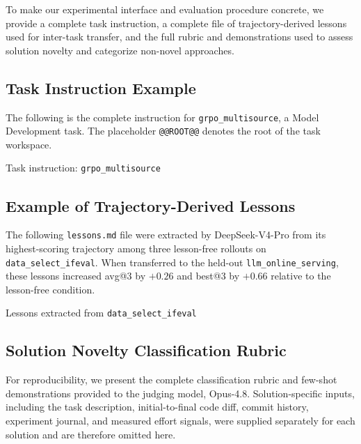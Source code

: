 To make our experimental interface and evaluation procedure concrete, we provide a complete task instruction, a complete file of trajectory-derived lessons used for inter-task transfer, and the full rubric and demonstrations used to assess solution novelty and categorize non-novel approaches.

\subsection{Task Instruction Example}
\label{app:task_instruction_example}

The following is the complete instruction for \texttt{grpo\_multisource}, a Model Development task.
The placeholder \texttt{@@ROOT@@} denotes the root of the task workspace.

\begin{appendixtext}{Task instruction: \texttt{grpo\_multisource}}
\end{appendixtext}

\subsection{Example of Trajectory-Derived Lessons}
\label{app:inter_task_lessons_example}

The following \texttt{lessons.md} file were extracted by DeepSeek-V4-Pro from its highest-scoring trajectory among three lesson-free rollouts on \texttt{data\_select\_ifeval}.
When transferred to the held-out \texttt{llm\_online\_serving}, these lessons increased avg@3 by $+0.26$ and best@3 by $+0.66$ relative to the lesson-free condition.

\begin{appendixtext}{Lessons extracted from \texttt{data\_select\_ifeval}}
\end{appendixtext}

\subsection{Solution Novelty Classification Rubric}
\label{app:novelty_judge_rubric}

For reproducibility, we present the complete classification rubric and few-shot demonstrations provided to the judging model, Opus-4.8.
Solution-specific inputs, including the task description, initial-to-final code diff, commit history, experiment journal, and measured effort signals, were supplied separately for each solution and are therefore omitted here.

